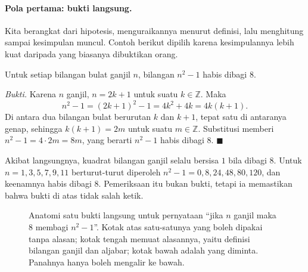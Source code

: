 \paragraph{Pola pertama: bukti langsung.} Kita berangkat dari hipotesis, menguraikannya
menurut definisi, lalu menghitung sampai kesimpulan muncul. Contoh berikut dipilih
karena kesimpulannya lebih kuat daripada yang biasanya dibuktikan orang.

\begin{teorema}
Untuk setiap bilangan bulat ganjil $n$, bilangan $n^{2}-1$ habis dibagi $8$.
\end{teorema}
\par\smallskip\noindent\textit{Bukti.} Karena $n$ ganjil, $n = 2k+1$ untuk suatu
$k \in \mathbb{Z}$. Maka
\[
  n^{2} - 1 = (2k+1)^{2} - 1 = 4k^{2} + 4k = 4k(k+1).
\]
Di antara dua bilangan bulat berurutan $k$ dan $k+1$, tepat satu di antaranya genap,
sehingga $k(k+1) = 2m$ untuk suatu $m \in \mathbb{Z}$. Substitusi memberi
$n^{2}-1 = 4 \cdot 2m = 8m$, yang berarti $n^{2}-1$ habis dibagi $8$.
\hfill$\blacksquare${\parfillskip=0pt\par}

Akibat langsungnya, kuadrat bilangan ganjil selalu bersisa $1$ bila dibagi $8$. Untuk
$n = 1,3,5,7,9,11$ berturut-turut diperoleh $n^{2}-1 = 0, 8, 24, 48, 80, 120$, dan
keenamnya habis dibagi $8$. Pemeriksaan itu bukan bukti, tetapi ia memastikan bahwa
bukti di atas tidak salah ketik.

\begin{figure}[htbp]
\centering
{}
\caption{Anatomi satu bukti langsung untuk pernyataan ``jika $n$ ganjil maka $8$ membagi
$n^{2}-1$''. Kotak atas satu-satunya yang boleh dipakai tanpa alasan; kotak tengah memuat
alasannya, yaitu definisi bilangan ganjil dan aljabar; kotak bawah adalah yang diminta.
Panahnya hanya boleh mengalir ke bawah.}
\label{fig:anatomi-bukti}
\end{figure}

